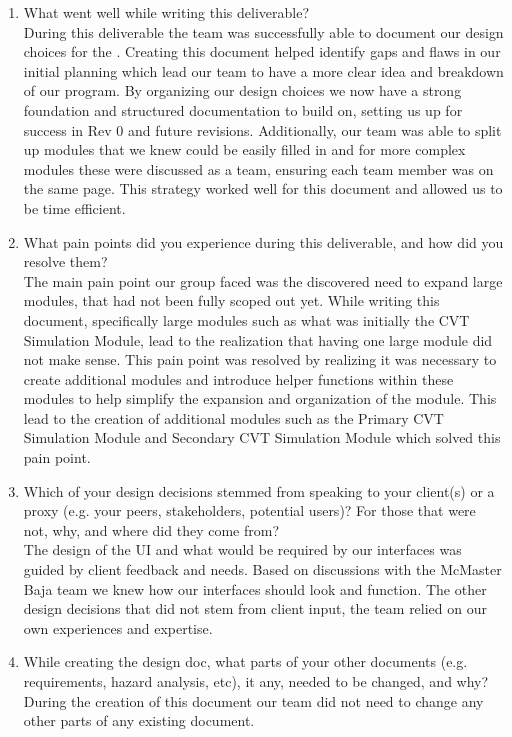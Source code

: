\documentclass[12pt, titlepage]{article}
\begin{document}
\begin{enumerate}
  \item What went well while writing this deliverable? 
  \\
  During this deliverable the team was successfully able to document our design choices for the \progname. 
  Creating this document helped identify gaps and flaws in our initial planning which lead our team to have a more clear idea and breakdown of our program.
  By organizing our design choices we now have a strong foundation and structured documentation to build on, setting us up for success in Rev 0 and future revisions. 
  Additionally, our team was able to split up modules that we knew could be easily filled in and for more complex modules these were discussed as a team, ensuring each team member was on the same page. 
  This strategy worked well for this document and allowed us to be time efficient.
  \item What pain points did you experience during this deliverable, and how
    did you resolve them?
  \\
  The main pain point our group faced was the discovered need to expand large modules, that had not been fully scoped out yet.
  While writing this document, specifically large modules such as what was initially the CVT Simulation Module, lead to the realization that having one large module did not make sense. 
  This pain point was resolved by realizing it was necessary to create additional modules and introduce helper functions within these modules to help simplify the expansion and organization of the module. 
  This lead to the creation of additional modules such as the Primary CVT Simulation Module and Secondary CVT Simulation Module which solved this pain point. 

  \item Which of your design decisions stemmed from speaking to your client(s)
  or a proxy (e.g. your peers, stakeholders, potential users)? For those that
  were not, why, and where did they come from?
  \\
  The design of the UI and what would be required by our interfaces was guided by client feedback and needs. 
  Based on discussions with the McMaster Baja team we knew how our interfaces should look and function.
  The other design decisions that did not stem from client input, the team relied on our own experiences and expertise. 

  \item While creating the design doc, what parts of your other documents (e.g.
  requirements, hazard analysis, etc), it any, needed to be changed, and why?
  \\
  During the creation of this document our team did not need to change any other parts of any existing document. 


\end{enumerate}
\end{document}

